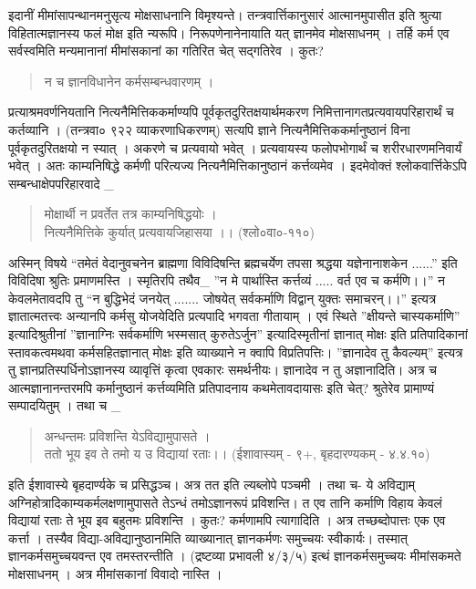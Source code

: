 इदानीं मीमांसापन्थानमनुसृत्य मोक्षसाधनानि विमृश्यन्ते। तन्त्रवार्त्तिकानुसारं आत्मानमुपासीत इति श्रुत्या विहितात्मज्ञानस्य फलं मोक्ष इति न्यरूपि। निरूपणेनानेनायाति यत् ज्ञानमेव मोक्षसाधनम् । तर्हि कर्म एव सर्वस्वमिति मन्यमानानां मीमांसकानां का गतिरित चेत्  सद्गतिरेव । कुतः?
\begin{verse}
न च ज्ञानविधानेन कर्मसम्बन्धवारणम् ।
\end{verse}
प्रत्याश्रमवर्णनियतानि नित्यनैमित्तिककर्माण्यपि पूर्वकृतदुरितक्षयार्थमकरण निमित्तानागतप्रत्यवायपरिहारार्थं च कर्तव्यानि । (तन्त्रवा० ९२२ व्याकरणाधिकरणम्) सत्यपि ज्ञाने नित्यनैमित्तिककर्मानुष्ठानं विना पूर्वकृतदुरितक्षयो न स्यात् । अकरणे च प्रत्यवायो भवेत् । प्रत्यवायस्य फलोपभोगार्थं च शरीरधारणमनिवार्यं भवेत् । अतः काम्यनिषिद्धे कर्मणी परित्यज्य नित्यनैमित्तिकानुष्ठानं कर्त्तव्यमेव । इदमेवोक्तं श्लोकवार्त्तिकेऽपि सम्बन्धाक्षेपपरिहारवादे _
\begin{verse}
मोक्षार्थी न प्रवर्तेत तत्र काम्यनिषिद्धयोः  ।\\
नित्यनैमित्तिके कुर्यात् प्रत्यवायजिहासया ।। (श्लो०वा०-११०)
\end{verse}
अस्मिन् विषये “तमेतं वेदानुवचनेन ब्राह्मणा विविदिषन्ति ब्रह्मचर्येण तपसा श्रद्धया यज्ञेनानाशकेन ......” इति विविदिषा श्रुतिः प्रमाणमस्ति । स्मृतिरपि तथैव_ ”न मे पार्थास्ति कर्त्तव्यं ..... वर्त एव च कर्मणि।।” न केवलमेतावदपि तु “न बुद्धिभेदं जनयेत् ....... जोषयेत् सर्वकर्माणि विद्वान् युक्तः समाचरन्।।” इत्यत्र ज्ञातात्मतत्त्वः अन्यानपि कर्मसु योजयेदिति प्रत्यपादि भगवता गीतायाम् । एवं स्थिते ”क्षीयन्ते चास्यकर्माणि” इत्यादिश्रुतीनां ”ज्ञानाग्निः सर्वकर्माणि भस्मसात् कुरुतेऽर्जुन” इत्यादिस्मृतीनां ज्ञानात् मोक्षः इति प्रतिपादिकानां स्तावकत्वमथवा कर्मसहितज्ञानात् मोक्षः इति व्याख्याने न क्वापि विप्रतिपत्तिः। ”ज्ञानादेव तु कैवल्यम्” इत्यत्र तु ज्ञानप्रतिस्पर्धिनोऽज्ञानस्य व्यावृत्तिं कृत्वा एवकारः समर्थनीयः। ज्ञानादेव न तु अज्ञानादिति। अत्र च आत्मज्ञानानन्तरमपि कर्मानुष्ठानं कर्त्तव्यमिति प्रतिपादनाय कथमेतावदायासः इति चेत्? श्रुतेरेव प्रामाण्यं सम्पादयितुम् । तथा च _
\begin{verse}
अन्धन्तमः प्रविशन्ति येऽविद्यामुपासते ।\\
ततो भूय इव ते तमो य उ विद्यायां रताः।। (ईशावास्यम् - ९+, बृहदारण्यकम् - ४.४.१०)
\end{verse}
इति ईशावास्ये बृहदार्ण्यके च प्रसिद्धञ्च। अत्र तत इति ल्यब्लोपे पञ्चमी । तथा च- ये अविद्याम् अग्निहोत्रादिकाम्यकर्मलक्षणामुपासते तेऽन्धं तमोऽज्ञानरूपं प्रविशन्ति। त एव तानि कर्माणि विहाय केवलं विद्यायां रताः ते भूय इव बहुतमः प्रविशन्ति । कुतः? कर्मणामपि त्यागादिति । अत्र तच्छब्दोपात्तः एक एव कर्त्ता । तस्यैव विद्या-अविद्यानुष्ठानमिति व्याख्यानात् ज्ञानकर्मणः समुच्चयः स्वीकार्यः। तस्मात् ज्ञानकर्मसमुच्चयवन्त एव तमस्तरन्तीति । (द्रष्टव्या प्रभावली ४/३/५) इत्थं ज्ञानकर्मसमुच्चयः मीमांसकमते मोक्षसाधनम् । अत्र मीमांसकानां विवादो नास्ति ।

